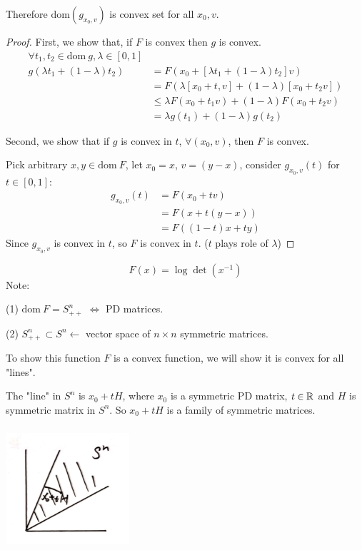 Therefore $\text{dom}(g_{x_0, v})$ is convex set for all $x_0, v$.

\begin{proof}
First, we show that, if $F$ is convex then $g$ is convex. 
\begin{align*}
\forall t_1, t_2\in \text{dom}\ g, \lambda\in [0,1]\\
g(\lambda t_1 +(1-\lambda)t_2) &= F(x_0+[\lambda t_1+(1-\lambda)t_2]v)\\
&= F(\lambda[x_0 +t, v]+(1-\lambda)[x_0+t_2v])\\
&\leq \lambda F(x_0+t_1 v)+(1-\lambda)F(x_0+t_2v)\\
&=\lambda g(t_1) + (1-\lambda)g(t_2)
\end{align*}

Second, we show that if $g$ is convex in $t$, $\forall(x_0, v)$, then $F$ is convex. 

Pick arbitrary $x,y\in \text{dom}\ F$, let $x_0 =x$, $v=(y-x)$, consider $g_{x_0, v}(t)$ for $t\in[0,1]$:
\begin{align*}
g_{x_0, v}(t) &= F(x_0+tv)\\
&= F(x+t(y-x))\\
&= F((1-t)x+ty)
\end{align*}
Since $g_{x_0, v}$ is convex in $t$, so $F$ is convex in $t$. ($t$ plays role of $\lambda$)

\end{proof}




\begin{example}
\begin{equation*}
F(x) =\log\det (x^{-1})
\end{equation*}
Note:

(1) $\text{dom}\ F = S^n_{++}$ $\Leftrightarrow$ PD matrices.

(2) $S^n_{++} \subset S^n \leftarrow$ vector space of $n\times n$ symmetric matrices. 

To show this function $F$ is a convex function, we will show it is convex for all "lines".

The "line" in $S^n$ is $x_0 + tH$, where $x_0$ is a symmetric PD matrix, $t\in \mathbb{R}$ and $H$ is symmetric matrix in $S^n$. So $x_0 + tH$ is a family of symmetric matrices.

\begin{marginfigure}
	\centering
	\includegraphics[width=1.8in,height=1.8in]{figures/ch08/figure1104_3.png}
\end{marginfigure}
\end{example}

